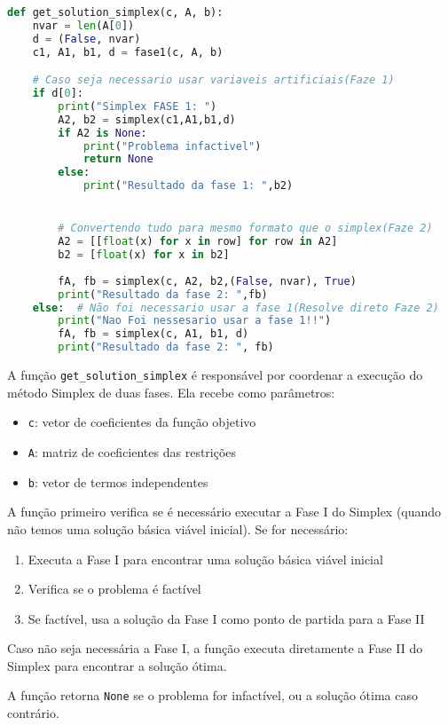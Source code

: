 \documentclass{article}
\begin{document}
\begin{lstlisting}[language=Python]
def get_solution_simplex(c, A, b):
    nvar = len(A[0])
    d = (False, nvar)
    c1, A1, b1, d = fase1(c, A, b)

    # Caso seja necessario usar variaveis artificiais(Faze 1)
    if d[0]:
        print("Simplex FASE 1: ")
        A2, b2 = simplex(c1,A1,b1,d)
        if A2 is None:
            print("Problema infactivel")
            return None
        else:
            print("Resultado da fase 1: ",b2)


        # Convertendo tudo para mesmo formato que o simplex(Faze 2)
        A2 = [[float(x) for x in row] for row in A2]
        b2 = [float(x) for x in b2] 
        
        fA, fb = simplex(c, A2, b2,(False, nvar), True)
        print("Resultado da fase 2: ",fb)
    else:  # Não foi necessario usar a fase 1(Resolve direto Faze 2)
        print("Nao Foi nessesario usar a fase 1!!")
        fA, fb = simplex(c, A1, b1, d)
        print("Resultado da fase 2: ", fb)
\end{lstlisting}


A função \texttt{get\_solution\_simplex} é responsável por coordenar a execução do método Simplex de duas fases. Ela recebe como parâmetros:

\begin{itemize}
    \item \texttt{c}: vetor de coeficientes da função objetivo
    \item \texttt{A}: matriz de coeficientes das restrições 
    \item \texttt{b}: vetor de termos independentes
\end{itemize}

A função primeiro verifica se é necessário executar a Fase I do Simplex (quando não temos uma solução básica viável inicial). Se for necessário:

\begin{enumerate}
    \item Executa a Fase I para encontrar uma solução básica viável inicial
    \item Verifica se o problema é factível
    \item Se factível, usa a solução da Fase I como ponto de partida para a Fase II
\end{enumerate}

Caso não seja necessária a Fase I, a função executa diretamente a Fase II do Simplex para encontrar a solução ótima.

A função retorna \texttt{None} se o problema for infactível, ou a solução ótima caso contrário.
\end{document}

